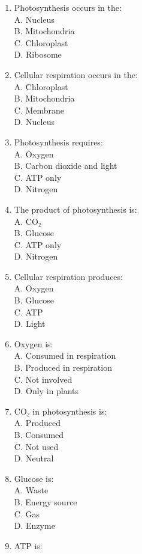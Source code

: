 \documentclass[
  letterpaper,
  DIV=11,
  numbers=noendperiod]{scrreprt}
\begin{document}
\begin{enumerate}
\def\labelenumi{\arabic{enumi}.}
\item
  Photosynthesis occurs in the:\\
  A. Nucleus\\
  B. Mitochondria\\
  C. Chloroplast\\
  D. Ribosome
\item
  Cellular respiration occurs in the:\\
  A. Chloroplast\\
  B. Mitochondria\\
  C. Membrane\\
  D. Nucleus
\item
  Photosynthesis requires:\\
  A. Oxygen\\
  B. Carbon dioxide and light\\
  C. ATP only\\
  D. Nitrogen
\item
  The product of photosynthesis is:\\
  A. CO₂\\
  B. Glucose\\
  C. ATP only\\
  D. Nitrogen
\item
  Cellular respiration produces:\\
  A. Oxygen\\
  B. Glucose\\
  C. ATP\\
  D. Light
\item
  Oxygen is:\\
  A. Consumed in respiration\\
  B. Produced in respiration\\
  C. Not involved\\
  D. Only in plants
\item
  CO₂ in photosynthesis is:\\
  A. Produced\\
  B. Consumed\\
  C. Not used\\
  D. Neutral
\item
  Glucose is:\\
  A. Waste\\
  B. Energy source\\
  C. Gas\\
  D. Enzyme
\item
  ATP is:\\

\end{enumerate}
\end{document}
